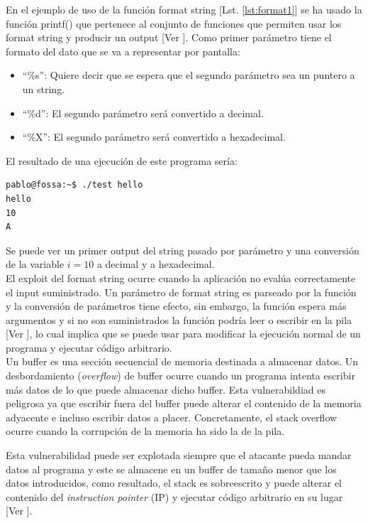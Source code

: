 \documentclass[10pt,a4paper]{article}
\begin{document}
En el ejemplo de uso de la función format string [Lst. \ref{lst:format1}] se ha usado la función printf() que pertenece al conjunto de funciones que permiten usar los format string y producir un output [Ver \cite{printf}]. Como primer parámetro tiene el formato del dato que se va a representar por pantalla:
\begin{itemize}
\item ``\%s'': Quiere decir que se espera que el segundo parámetro sea un puntero a un string.
\item ``\%d'': El segundo parámetro será convertido a decimal.
\item ``\%X'': El segundo parámetro será convertido a hexadecimal.
\end{itemize}
El resultado de una ejecución de este programa sería:
\begin{lstlisting}[language=bash]
pablo@fossa:~$ ./test hello
hello
10
A
\end{lstlisting}
Se puede ver un primer output del string pasado por parámetro y una conversión de la variable $i=10$ a decimal y a hexadecimal.\\

El exploit del format string ocurre cuando la aplicación no evalúa correctamente el input suministrado. Un parámetro de format string es parseado por la función y la conversión de parámetros tiene efecto, sin embargo, la función espera más argumentos y si no son suministrados la función podría leer o escribir en la pila [Ver \cite{format}], lo cual implica que se puede usar para modificar la ejecución normal de un programa y ejecutar código arbitrario.\\

Un buffer es una sección secuencial de memoria destinada a almacenar datos. Un desbordamiento (\textit{overflow}) de buffer ocurre cuando un programa intenta escribir más datos de lo que puede almacenar dicho buffer. Esta vulnerabildiad es peligrosa ya que escribir fuera del buffer puede alterar el contenido de la memoria adyacente e incluso escribir datos a placer. Concretamente, el stack overflow ocurre cuando la corrupción de la memoria ha sido la de la pila.

Esta vulnerabilidad puede ser explotada siempre que el atacante pueda mandar datos al programa y este se almacene en un buffer de tamaño menor que los datos introducidos, como resultado, el stack es sobreescrito y puede alterar el contenido del \textit{instruction pointer} (IP) y ejecutar código arbitrario en su lugar [Ver \cite{buffer}]. \\
\end{document}
